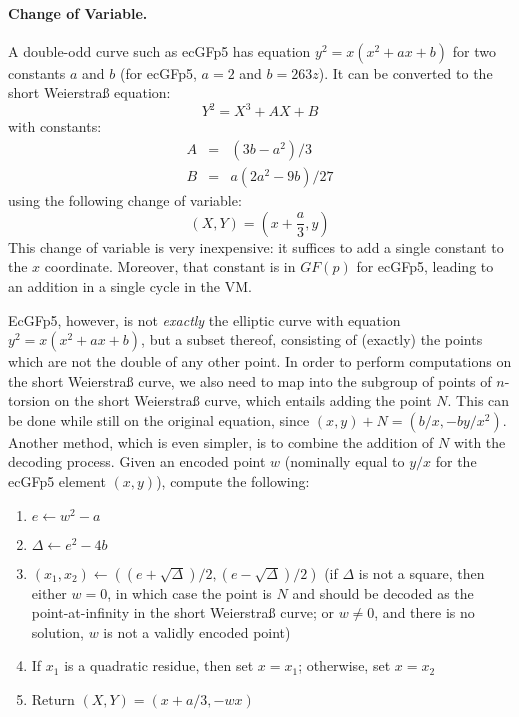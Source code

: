 \documentclass{llncs}
\newcommand{\GF}{GF}
\begin{document}
\paragraph{Change of Variable.} A double-odd curve such as ecGFp5 has
equation $y^2 = x(x^2 + ax + b)$ for two constants $a$ and $b$ (for
ecGFp5, $a = 2$ and $b = 263z$). It can be converted to the short
Weierstraß equation:
\begin{equation*}
    Y^2 = X^3 + A X + B
\end{equation*}
with constants:
\begin{eqnarray*}
    A &=& (3b - a^2)/3 \\
    B &=& a(2a^2 - 9b)/27
\end{eqnarray*}
using the following change of variable:
\begin{equation*}
    (X, Y) = (x + \frac{a}{3}, y)
\end{equation*}
This change of variable is very inexpensive: it suffices to add a single
constant to the $x$ coordinate. Moreover, that constant is in $\GF(p)$
for ecGFp5, leading to an addition in a single cycle in the VM.

EcGFp5, however, is not \emph{exactly} the elliptic curve with equation
$y^2 = x(x^2 + ax + b)$, but a subset thereof, consisting of (exactly)
the points which are not the double of any other point. In order to
perform computations on the short Weierstraß curve, we also need to map
into the subgroup of points of $n$-torsion on the short Weierstraß curve,
which entails adding the point $N$. This can be done while still on
the original equation, since $(x, y) + N = (b/x, -b y/x^2)$. Another
method, which is even simpler, is to combine the addition of $N$ with
the decoding process. Given an encoded point $w$ (nominally equal to $y/x$
for the ecGFp5 element $(x, y)$), compute the following:
\begin{enumerate}

    \item $e \leftarrow w^2 - a$

    \item $\Delta \leftarrow e^2 - 4b$

    \item $(x_1, x_2) \leftarrow ((e + \sqrt{\Delta})/2, (e - \sqrt{\Delta})/2)$
    (if $\Delta$ is not a square, then either $w = 0$, in which case the
    point is $N$ and should be decoded as the point-at-infinity in the
    short Weierstraß curve; or $w \neq 0$, and there is no solution, $w$
    is not a validly encoded point)

    \item \label{step:decode-choose-qr}If $x_1$ is a quadratic residue,
    then set $x = x_1$; otherwise, set $x = x_2$

    \item Return $(X, Y) = (x + a/3, -wx)$

\end{enumerate}
\end{document}
